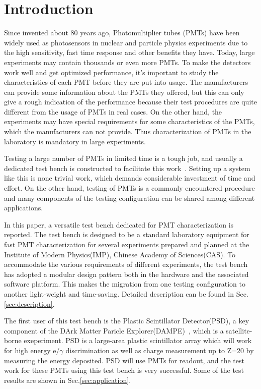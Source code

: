 \documentclass[review, times]{elsarticle}
\begin{document}
\section{Introduction}
\label{sec:introduction}

Since invented about 80 years ago, Photomultiplier tubes (PMTs) have been widely used as photosensors in nuclear and particle physics experiments due to the high sensitivity, fast time response and other benefits they have. Today, large experiments may contain thousands or even more PMTs. To make the detectors work well and get optimized performance, it's important to study the characteristics of each PMT before they are put into usage. 
The manufacturers can provide some information about the PMTs they offered, but this can only give a rough indication of the performance because their test procedures are quite different from the usage of PMTs in real cases. On the other hand, the experiments may have special requirements for some characteristics of the PMTs, which the manufacturers can not provide. 
Thus characterization of PMTs in the laboratory is mandatory in large experiments.

Testing a large number of PMTs in limited time is a tough job, and usually a dedicated test bench is constructed to facilitate this work~\cite{barnhill_testing_2008,akgun_complete_2005,adragna_pmt-block_2006}.
Setting up a system like this is none trivial work, which demands considerable investment of time and effort.
On the other hand, testing of PMTs is a commonly encountered procedure and many components of the testing configuration can be shared among different applications.

In this paper, a versatile test bench dedicated for PMT characterization is reported.
The test bench is designed to be a standard laboratory equipment for fast PMT characterization for several experiments prepared and planned at the Institute of Modern Physics(IMP), Chinese Academy of Sciences(CAS).
To accommodate the various requirements of different experiments, the test bench has adopted a modular design pattern both in the hardware and the associated software platform.
This makes the migration from one testing configuration to another light-weight and time-saving.
Detailed description can be found in Sec.\ref{sec:description}.

The first user of this test bench is the Plastic Scintillator Detector(PSD), a key component of the DArk Matter Paricle Explorer(DAMPE)~\cite{Chang_Jin_dampe}, which is a satellite-borne exeperiment. 
PSD is a large-area plastic scintillator array which will work for high energy e/$\gamma$ discrimination as well as charge measurement up to Z=20 by measuring the energy deposited.
PSD will use PMTs for readout, and the test work for these PMTs using this test bench is very successful. Some of the test results are shown in Sec.\ref{sec:application}.
\end{document}
